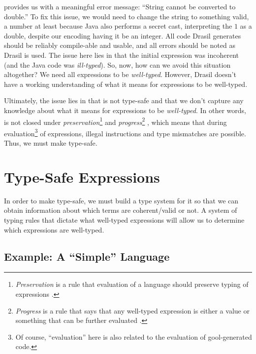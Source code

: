 \pseudoExampleLandPosQDBadTypingJavaCodeCompErr{}

 provides us with a
meaningful error message: ``String cannot be converted to double.'' To fix this
issue, we would need to change the string to something valid, a number at least
because Java also performs a secret cast, interpreting the \(1\) as a double,
despite our encoding having it be an integer. All code Drasil generates should
be reliably compile-able and usable, and all errors should be noted as Drasil is
used. The issue here lies in that the initial expression was incoherent (and the
Java code was \textit{ill-typed}). So, now, how can we avoid this situation
altogether? We need all expressions to be \textit{well-typed}. However, Drasil
doesn't have a working understanding of what it means for expressions to be
well-typed.

Ultimately, the issue lies in that \Expr{} is not type-safe \cite{Harper2016}
and that we don't capture any knowledge about what it means for expressions to
be \textit{well-typed}. In other words, \Expr{} is not closed under
\textit{preservation}\footnote{\textit{Preservation} is a rule that evaluation
of a language should preserve typing of expressions \cite{Harper2016}.} and
\textit{progress}\footnote{\textit{Progress} is a rule that says that any
well-typed expression is either a value or something that can be further
evaluated \cite{Harper2016}.} \cite{Harper2016}, which means that during
evaluation\footnote{Of course, ``evaluation'' here is also related to the
evaluation of \acs{gool}-generated code.} of expressions, illegal instructions
and type mismatches are possible. Thus, we must make \Expr{} type-safe.

\section{Type-Safe Expressions}
\label{chap:typed-expr:sec:type-safe-expressions}

In order to make \Expr{} type-safe, we must build a type system for it so that
we can obtain information about which \Expr{} terms are coherent/valid or not. A
system of typing rules that dictate what well-typed expressions will allow us to
determine which expressions are well-typed.

\subsection{Example: A \textquotedblleft{}Simple\textquotedblright{} Language}
\label{chap:typed-expr:sec:type-safe-expressions:subsec:example-a-simple-language}


